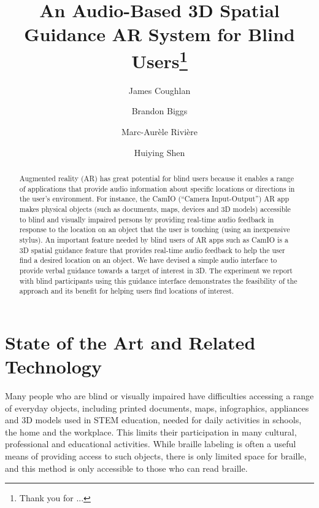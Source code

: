 \documentclass[runningheads]{res/templates/llncs}
\begin{document}
\title{An Audio-Based 3D Spatial Guidance AR System for Blind Users\thanks{Thank you for ...}}

\author{James Coughlan \and
Brandon Biggs \and
Marc-Aurèle Rivière \and
Huiying Shen}


%
\maketitle %
%
\begin{abstract}
Augmented reality (AR) has great potential for blind users because it
enables a range of applications that provide audio information about
specific locations or directions in the user's environment. For
instance, the CamIO (``Camera Input-Output'') AR app makes physical
objects (such as documents, maps, devices and 3D models) accessible to
blind and visually impaired persons by providing real-time audio
feedback in response to the location on an object that the user is
touching (using an inexpensive stylus). An important feature needed by
blind users of AR apps such as CamIO is a 3D spatial guidance feature
that provides real-time audio feedback to help the user find a desired
location on an object. We have devised a simple audio interface to
provide verbal guidance towards a target of interest in 3D. The
experiment we report with blind participants using this guidance
interface demonstrates the feasibility of the approach and its benefit
for helping users find locations of interest.

\end{abstract}
%

\hypertarget{sota}{%
\section{State of the Art and Related Technology}\label{sota}}

Many people who are blind or visually impaired have difficulties
accessing a range of everyday objects, including printed documents,
maps, infographics, appliances and 3D models used in STEM education,
needed for daily activities in schools, the home and the workplace. This
limits their participation in many cultural, professional and
educational activities. While braille labeling is often a useful means
of providing access to such objects, there is only limited space for
braille, and this method is only accessible to those who can read
braille.
\end{document}
